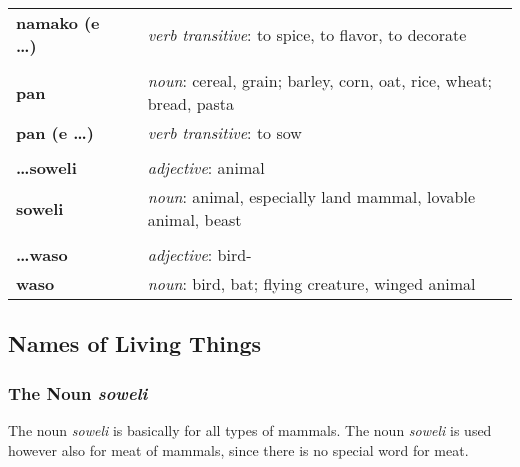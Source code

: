 \begin{supertabular}{p{2,5cm}|ll}
    \textbf{namako (e \dots)} &  & \textit{verb transitive}: to spice, to flavor, to decorate                                        \\
                              &  &                                                                                                   \\
    \textbf{pan}              &  & \textit{noun}: cereal, grain; barley, corn, oat, rice, wheat; bread, pasta                        \\
    \textbf{pan (e \dots)}    &  & \textit{verb transitive}: to sow                                                                  \\
                              &  &                                                                                                   \\
    \textbf{\dots soweli}     &  & \textit{adjective}: animal                                                                        \\
    \textbf{soweli}           &  & \textit{noun}: animal, especially land mammal, lovable animal, beast                              \\
                              &  &                                                                                                   \\
    \textbf{\dots waso}       &  & \textit{adjective}: bird-                                                                         \\
    \textbf{waso}             &  & \textit{noun}: bird, bat; flying creature, winged animal                                          \\
\end{supertabular}

\newpage

\subsection*{Names of Living Things}
\subsubsection*{The Noun \textit{soweli}}
The noun \textit{soweli} is basically for all types of mammals.
The noun \textit{soweli} is used however also for meat of mammals, since there is no special word for meat.

